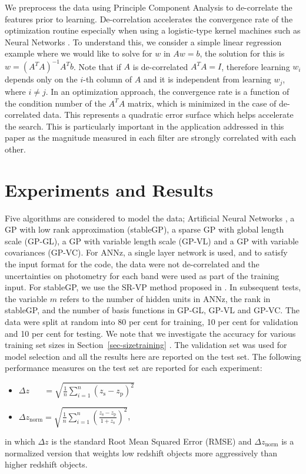 \documentclass[useAMS,usenatbib,fleqn]{mn2e}
\begin{document}
We preprocess the data using Principle Component Analysis \citep[PCA;][]{jolliffe1986} to de-correlate the features prior to learning. De-correlation accelerates the convergence rate of the optimization routine especially when using a logistic-type kernel machines such as Neural Networks \citep{lecun1998}. To understand this, we consider a simple linear regression example where we would like to solve for $w$ in $Aw=b$, the solution for this is $w=\left(A^{T}A\right)^{-1}A^{T}b$. Note that if $A$ is de-correlated $A^{T}A=I$, therefore learning $w_{i}$ depends only on the $i$-th column of $A$ and it is independent from learning $w_{j}$, where $i\ne j$. In an optimization approach, the convergence rate is a function of the condition number of the $A^{T}A$ matrix, which is minimized in the case of de-correlated data. This represents a quadratic error surface which helps accelerate the search. This is particularly important in the application addressed in this paper as the magnitude measured in each filter are strongly correlated with each other. 

\section{Experiments and Results}
\label{sec-experiments}

Five algorithms are considered to model the data; Artificial Neural Networks \citep[ANNz;][]{Collister04}, a GP with low rank approximation (stableGP), a sparse GP with global length scale (GP-GL), a GP with variable length scale (GP-VL) and a GP with variable covariances (GP-VC). For ANNz, a single layer network is used, and to satisfy the input format for the code, the data were not de-correlated and the uncertainties on photometry for each band were used as part of the training input. For stableGP, we use the SR-VP method proposed in \citep{foster2009}. In subsequent tests, the variable $m$ refers to the number of hidden units in ANNz, the rank in stableGP, and the number of basis functions in GP-GL, GP-VL and GP-VC. The data were split at random into 80 per cent for training, 10 per cent for validation and 10 per cent for testing. We note that we investigate the accuracy for various training set sizes in Section~\ref{sec-sizetraining} . The validation set was used for model selection and all the results here are reported on the test set. The following performance measures on the test set are reported for each experiment:
\begin{itemize}
  \item $\Delta z_{\phantom{norm}} = \sqrt{\frac{1}{n}\sum_{i=1}^{n}\left(z_\textrm{s}-z_\textrm{p}\right)^{2}}$
  \item $\Delta z_\textrm{norm} = \sqrt{\frac{1}{n}\sum_{i=1}^{n}\left(\frac{z_\textrm{s}-z_\textrm{p}}{1+z_\textrm{s}}\right)^{2}}$,
\end{itemize}
in which $\Delta z$ is the standard Root Mean Squared Error (RMSE) and $\Delta z_\textrm{norm}$ is a normalized version that weights low redshift objects more aggressively than higher redshift objects. %
\end{document}
